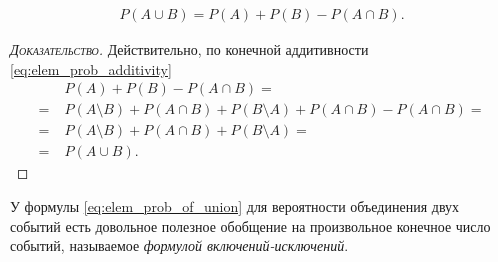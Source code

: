 \documentclass[../main.tex]{subfiles}
\begin{document}
\begin{crly}
 \begin{align}
  \label{eq:elem_prob_of_union}
  P(A \cup B) = P(A) + P(B) - P(A \cap B).
 \end{align}
\end{crly}
\begin{proof}[\normalfont\textsc{Доказательство}]
 Действительно, по конечной аддитивности \eqref{eq:elem_prob_additivity}
 \begin{align*}
  &P(A) + P(B) - P(A \cap B) = \\
  =\;&P(A \setminus B) + P(A \cap B) + P(B \setminus A) + P(A \cap B) - P(A\cap B) = \\
  =\;&P(A \setminus B) + P(A\cap B) + P(B \setminus A) = \\
  =\;&P(A \cup B).
 \end{align*}
\end{proof}

У формулы \eqref{eq:elem_prob_of_union} для вероятности объединения двух событий есть довольное полезное обобщение на произвольное конечное число событий, называемое \textit{формулой включений-исключений}.
\end{document}
